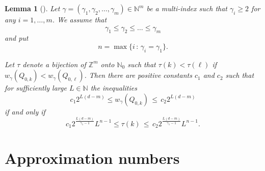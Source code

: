 \documentclass[12pt]{article}
\newtheorem{Lem}{Lemma}
\newcommand{\R}{{\mathbb R}}
\newcommand{\N}{{\mathbb N}}
\newcommand{\Z}{\mathbb Z}
\begin{document}
\begin{Lem}[\cite{DS}]\label{volumn}
	Let $\gamma= (\gamma_1 , \gamma_2, \ldots , \gamma_m)\in \N^m$ be a multi-index such that $\gamma_i\ge 2$ for any $i=1,\ldots ,m$.  
	We assume that   
	\begin{equation*}
		\gamma_1 \le  \gamma_2\le  \ldots \le  \gamma_m
	\end{equation*}
	and put 
	\begin{equation*}
		n = \max\{ i\,:\, \gamma_i=\gamma_1\}.
	\end{equation*} 
	
	Let  $\tau$ denote a bijection of $\Z^m$ onto $\N_0$ such that $\tau(k)< \tau(\ell)$ if $w_\gamma (Q_{0,k}) <  w_\gamma (Q_{0,\ell})$. 
	Then  there are positive constants $c_1$ and $c_2$ such that for sufficiently large $L\in \N$ the inequalities 
	\begin{equation}\label{red1}
		c_1 2^{L(d-m)} \le w_\gamma (Q_{0,k}) \,\le \,c_2 2^{L(d-m)}  
	\end{equation} 
	if and only if 
	\begin{equation*}
		c_1  2^{\frac{L(d-m)}{\gamma_1-1}}L^{n-1}\le \tau(k)  \,\le \,c_2 2^{\frac{L(d-m)}{\gamma_1-1}}L^{n-1}.
	\end{equation*}
\end{Lem}












\section{ Approximation numbers}
\end{document}
